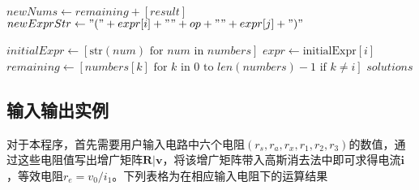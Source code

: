 \begin{breakablealgorithm}
\begin{algorithmic}[1]
                        \State $newNums \gets remaining + [result]$
                        \State $newExprStr \gets "(" + expr[i] + " " + op + " " + expr[j] + ")"$
                        
                        \State {}
                    \EndFor
                \EndFor
            \EndFor
        \EndFunction
        
        \State $initialExpr \gets [\text{str}(num) \text{ for } num \text{ in } numbers]$
            \State $expr \gets \text{initialExpr}[i]$
            \State $remaining \gets [numbers[k] \text{ for } k \text{ in } 0 \text{ to } len(numbers)-1 \text{ if } k \neq i]$
            \State {}
        \EndFor
        \State \Return $solutions$
    \end{algorithmic}
    
\end{breakablealgorithm}

\subsection{输入输出实例}
对于本程序，首先需要用户输入电路中六个电阻$(r_s,r_a,r_x,r_1,r_2,r_3)$的数值，通过这些电阻值写出增广矩阵$\boldsymbol{R}|\boldsymbol{v}$，将该增广矩阵带入高斯消去法中即可求得电流$\boldsymbol{i}$，等效电阻$r_e=v_0/i_1$。下列表格为在相应输入电阻下的运算结果
